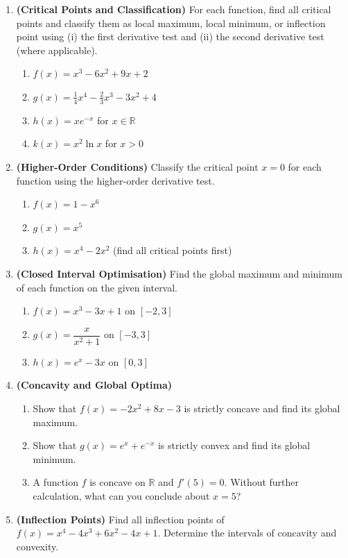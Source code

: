 \documentclass[12pt, a4paper]{article}
\theoremstyle{definition}
\newcommand{\R}{\mathbb{R}}
\begin{document}
\begin{enumerate}[label=\textbf{A\arabic*.}, leftmargin=2.5em]

\item \textbf{(Critical Points and Classification)}
For each function, find all critical points and classify them as local
maximum, local minimum, or inflection point using (i) the first derivative
test and (ii) the second derivative test (where applicable).
\begin{enumerate}[label=(\alph*)]
  \item $f(x) = x^3 - 6x^2 + 9x + 2$
  \item $g(x) = \frac{1}{4}x^4 - \frac{2}{3}x^3 - 3x^2 + 4$
  \item $h(x) = xe^{-x}$ for $x \in \R$
  \item $k(x) = x^2\ln x$ for $x > 0$
\end{enumerate}

\item \textbf{(Higher-Order Conditions)}
Classify the critical point $x=0$ for each function using the
higher-order derivative test.
\begin{enumerate}[label=(\alph*)]
  \item $f(x) = 1 - x^6$
  \item $g(x) = x^5$
  \item $h(x) = x^4 - 2x^2$ \; (find all critical points first)
\end{enumerate}

\item \textbf{(Closed Interval Optimisation)}
Find the global maximum and minimum of each function on the given interval.
\begin{enumerate}[label=(\alph*)]
  \item $f(x) = x^3 - 3x + 1$ on $[-2, 3]$
  \item $g(x) = \dfrac{x}{x^2+1}$ on $[-3, 3]$
  \item $h(x) = e^x - 3x$ on $[0, 3]$
\end{enumerate}

\item \textbf{(Concavity and Global Optima)}
\begin{enumerate}[label=(\alph*)]
  \item Show that $f(x) = -2x^2 + 8x - 3$ is strictly concave and find
        its global maximum.
  \item Show that $g(x) = e^x + e^{-x}$ is strictly convex and find its
        global minimum.
  \item A function $f$ is concave on $\R$ and $f'(5) = 0$.
        Without further calculation, what can you conclude about $x=5$?
\end{enumerate}

\item \textbf{(Inflection Points)}
Find all inflection points of $f(x) = x^4 - 4x^3 + 6x^2 - 4x + 1$.
Determine the intervals of concavity and convexity.

\end{enumerate}
\end{document}
